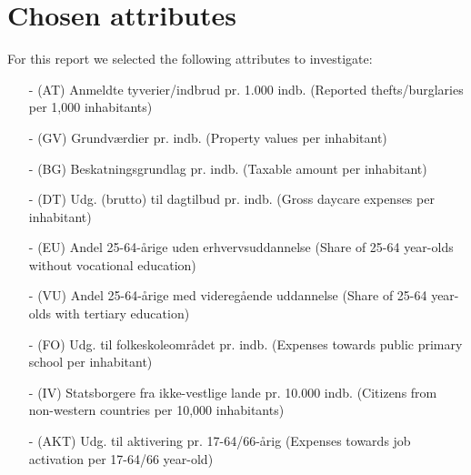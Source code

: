 \section{Chosen attributes}\label{app:attrs}
For this report we selected the following attributes to investigate:
\begin{itemize}
	\item[-] (AT) Anmeldte tyverier/indbrud pr. 1.000 indb. (Reported thefts/burglaries per 1,000 inhabitants)
	\item[-] (GV) Grundværdier pr. indb. (Property values per inhabitant)
	\item[-] (BG) Beskatningsgrundlag pr. indb. (Taxable amount per inhabitant)
	\item[-] (DT) Udg. (brutto) til dagtilbud pr. indb. (Gross daycare expenses per inhabitant)
	\item[-] (EU) Andel 25-64-årige uden erhvervsuddannelse (Share of 25-64 year-olds without vocational education)
	\item[-] (VU) Andel 25-64-årige med videregående uddannelse (Share of 25-64 year-olds with tertiary education)
	\item[-] (FO) Udg. til folkeskoleområdet pr. indb. (Expenses towards public primary school per inhabitant)
	\item[-] (IV) Statsborgere fra ikke-vestlige lande pr. 10.000 indb. (Citizens from non-western countries per 10,000 inhabitants)
	\item[-] (AKT) Udg. til aktivering pr. 17-64/66-årig (Expenses towards job activation per 17-64/66 year-old)
\end{itemize}
